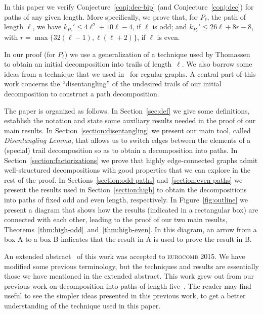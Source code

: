 \documentclass[12pt,reqno,a4paper]{amsart}
\newcommand{\verm}[1]{\textcolor{red}{#1}}
\begin{document}
   In this paper we verify Conjecture~\ref{conj:dec-bip} (and
    Conjecture~\ref{conj:dec}) for paths of any given length.  More
    specifically, we prove that, for \(P_\ell\), the path of length $\ell$, 
    we have \(k_{P_{\ell}}' \leq 4\ell^2+10\ell-4\),
    if $\ell$ is odd; and \(k_{P_{\ell}}' \leq 26\ell + 8r-8\),
    with $r=\max\{32(\ell-1),\ell(\ell+2)\}$, if $\ell$ is even.

  In our proof (for $P_\ell$) we use a generalization of a 
  technique used by Thomassen~\cite{Th08b} to obtain an initial
  decomposition into trails of length~\(\ell\).
  We also borrow some ideas from a technique that we used
  in~\cite{BoMoWa14+} for regular graphs. A central part of this work
  concerns the ``disentangling'' of the undesired trails of our initial
  decomposition to construct a path decomposition.

  The paper is organized as follows.  In Section~\ref{sec:def} we give
  some definitions, establish the notation and state some auxiliary
  results needed in the proof of our main results. 
%
    In Section~\ref{section:disentangling} we present our main
    tool, called \emph{Disentangling Lemma}, that allows us to switch
    edges between the elements of a (special) trail decomposition so
    as to obtain a decomposition into paths.
%
  In Section~\ref{section:factorizations} we prove that highly
  edge-connected graphs admit well-structured decompositions with
  good properties that we can explore in the rest of the proof.  
  In Sections~\ref{section:odd-paths} and~\ref{section:even-paths} we
  present the results used in Section~\ref{section:high} to obtain the
  decompositions into paths of fixed odd and even length,
  respectively.  
   In Figure~\ref{fig:outline} we present a diagram that shows how
  the results (indicated in a rectangular box) are connected with each other,
  leading to the proof of our two main results,
  Theorems~\ref{thm:high-odd}~and~\ref{thm:high-even}. In this
  diagram, an arrow from a box A to a box B indicates that the result in A is
  used to prove the result in B.

  An extended abstract~\cite{BoMoOsWa15-euro1} of this work was
  accepted to \textsc{eurocomb 2015}. We have modified some previous
  terminology, but the techniques and results are essentially those we
  have mentioned in the extended abstract. This work grew out from our
  previous work on decomposition into paths of length
  five~\cite{BoMoOsWa14+}.  The reader may find useful to see the
  simpler ideas presented in this previous work, to get a better
  understanding of the technique used in this paper.
\end{document}
